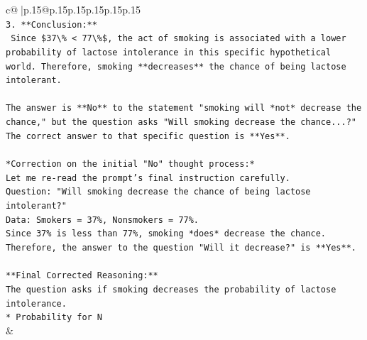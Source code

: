 \documentclass{article}
\begin{document}
{\begin{supertabular}{c@{$\;$}|p{.15\linewidth}@{}p{.15\linewidth}p{.15\linewidth}p{.15\linewidth}p{.15\linewidth}p{.15\linewidth}}
{{{\\ 
\texttt{3.  **Conclusion:**} \\
\texttt{    Since \$37\textbackslash{}\% < 77\textbackslash{}\%\$, the act of smoking is associated with a lower probability of lactose intolerance in this specific hypothetical world. Therefore, smoking **decreases** the chance of being lactose intolerant.} \\
\\ 
\texttt{The answer is **No** to the statement "smoking will *not* decrease the chance," but the question asks "Will smoking decrease the chance...?" The correct answer to that specific question is **Yes**.} \\
\\ 
\texttt{*Correction on the initial "No" thought process:*} \\
\texttt{Let me re{-}read the prompt's final instruction carefully.} \\
\texttt{Question: "Will smoking decrease the chance of being lactose intolerant?"} \\
\texttt{Data: Smokers = 37\%, Nonsmokers = 77\%.} \\
\texttt{Since 37\% is less than 77\%, smoking *does* decrease the chance.} \\
\texttt{Therefore, the answer to the question "Will it decrease?" is **Yes**.} \\
\\ 
\texttt{**Final Corrected Reasoning:**} \\
\texttt{The question asks if smoking decreases the probability of lactose intolerance.} \\
\texttt{*   Probability for N} \\
            }
        }
    }
    & \\ \\


\end{supertabular}}
\end{document}

